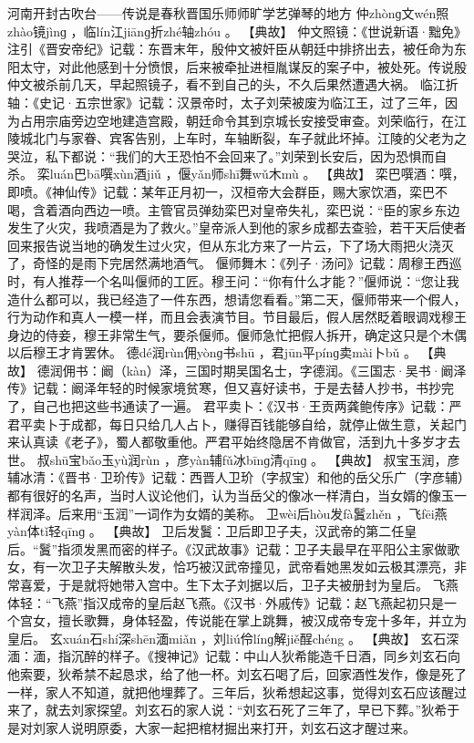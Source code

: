 \documentclass[12pt,UTF8]{ctexbook}
\begin{document}
河南开封古吹台——传说是春秋晋国乐师师旷学艺弹琴的地方
仲zhònɡ文wén照zhào镜jìnɡ
，临lín江jiānɡ折zhé轴zhóu
。
【典故】
仲文照镜：《世说新语·黜免》注引《晋安帝纪》记载：东晋末年，殷仲文被奸臣从朝廷中排挤出去，被任命为东阳太守，对此他感到十分愤恨，后来被牵扯进桓胤谋反的案子中，被处死。传说殷仲文被杀前几天，早起照镜子，看不到自己的头，不久后果然遭遇大祸。
临江折轴：《史记·五宗世家》记载：汉景帝时，太子刘荣被废为临江王，过了三年，因为占用宗庙旁边空地建造宫殿，朝廷命令其到京城长安接受审查。刘荣临行，在江陵城北门与家眷、宾客告别，上车时，车轴断裂，车子就此坏掉。江陵的父老为之哭泣，私下都说：“我们的大王恐怕不会回来了。”刘荣到长安后，因为恐惧而自杀。
栾luán巴bā噀xùn酒jiǔ
，偃yǎn师shī舞wǔ木mù
。
【典故】
栾巴噀酒：噀，即喷。《神仙传》记载：某年正月初一，汉桓帝大会群臣，赐大家饮酒，栾巴不喝，含着酒向西边一喷。主管官员弹劾栾巴对皇帝失礼，栾巴说：“臣的家乡东边发生了火灾，我喷酒是为了救火。”皇帝派人到他的家乡成都去查验，若干天后使者回来报告说当地的确发生过火灾，但从东北方来了一片云，下了场大雨把火浇灭了，奇怪的是雨下完居然满地酒气。
偃师舞木：《列子·汤问》记载：周穆王西巡时，有人推荐一个名叫偃师的工匠。穆王问：“你有什么才能？”偃师说：“您让我造什么都可以，我已经造了一件东西，想请您看看。”第二天，偃师带来一个假人，行为动作和真人一模一样，而且会表演节目。节目最后，假人居然眨着眼调戏穆王身边的侍妾，穆王非常生气，要杀偃师。偃师急忙把假人拆开，确定这只是个木偶以后穆王才肯罢休。
德dé润rùn佣yònɡ书shū
，君jūn平pínɡ卖mài卜bǔ
。
【典故】
德润佣书：阚（kàn）泽，三国时期吴国名士，字德润。《三国志·吴书·阚泽传》记载：阚泽年轻的时候家境贫寒，但又喜好读书，于是去替人抄书，书抄完了，自己也把这些书通读了一遍。
君平卖卜：《汉书·王贡两龚鲍传序》记载：严君平卖卜于成都，每日只给几人占卜，赚得百钱能够自给，就停止做生意，关起门来认真读《老子》，蜀人都敬重他。严君平始终隐居不肯做官，活到九十多岁才去世。
叔shū宝bǎo玉yù润rùn
，彦yàn辅fǔ冰bīnɡ清qīnɡ
。
【典故】
叔宝玉润，彦辅冰清：《晋书·卫玠传》记载：西晋人卫玠（字叔宝）和他的岳父乐广（字彦辅）都有很好的名声，当时人议论他们，认为当岳父的像冰一样清白，当女婿的像玉一样润泽。后来用“玉润”一词作为女婿的美称。
卫wèi后hòu发fà鬒zhěn
，飞fēi燕yàn体tǐ轻qīnɡ
。
【典故】
卫后发鬒：卫后即卫子夫，汉武帝的第二任皇后。“鬒”指须发黑而密的样子。《汉武故事》记载：卫子夫最早在平阳公主家做歌女，有一次卫子夫解散头发，恰巧被汉武帝撞见，武帝看她黑发如云极其漂亮，非常喜爱，于是就将她带入宫中。生下太子刘据以后，卫子夫被册封为皇后。
飞燕体轻：“飞燕”指汉成帝的皇后赵飞燕。《汉书·外戚传》记载：赵飞燕起初只是一个宫女，擅长歌舞，身体轻盈，传说能在掌上跳舞，被汉成帝专宠十多年，并立为皇后。
玄xuán石shí深shēn湎miǎn
，刘liú伶línɡ解jiě酲chéng
。
【典故】
玄石深湎：湎，指沉醉的样子。《搜神记》记载：中山人狄希能造千日酒，同乡刘玄石向他索要，狄希禁不起恳求，给了他一杯。刘玄石喝了后，回家酒性发作，像是死了一样，家人不知道，就把他埋葬了。三年后，狄希想起这事，觉得刘玄石应该醒过来了，就去刘家探望。刘玄石的家人说：“刘玄石死了三年了，早已下葬。”狄希于是对刘家人说明原委，大家一起把棺材掘出来打开，刘玄石这才醒过来。
\end{document}
